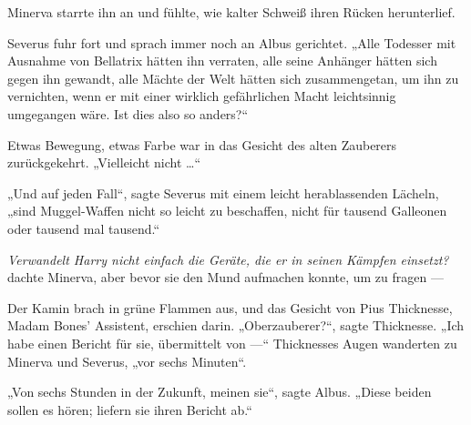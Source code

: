 Minerva starrte ihn an und fühlte, wie kalter Schweiß ihren Rücken herunterlief.

Severus fuhr fort und sprach immer noch an Albus gerichtet.
„Alle Todesser mit Ausnahme von Bellatrix hätten ihn verraten, alle seine Anhänger hätten sich gegen ihn gewandt, alle Mächte der Welt hätten sich zusammengetan, um ihn zu vernichten, wenn er mit einer wirklich gefährlichen Macht leichtsinnig umgegangen wäre. Ist dies also so anders?“

Etwas Bewegung, etwas Farbe war in das Gesicht des alten Zauberers zurückgekehrt.
„Vielleicht nicht …“

„Und auf jeden Fall“, sagte Severus mit einem leicht herablassenden Lächeln, „sind Muggel-Waffen nicht so leicht zu beschaffen, nicht für tausend Galleonen oder tausend mal tausend.“

\emph{Verwandelt Harry nicht einfach die Geräte, die er in seinen Kämpfen einsetzt?} dachte Minerva, aber bevor sie den Mund aufmachen konnte, um zu fragen —

Der Kamin brach in grüne Flammen aus, und das Gesicht von Pius Thicknesse, Madam Bones’ Assistent, erschien darin.
„Oberzauberer?“, sagte Thicknesse.
„Ich habe einen Bericht für sie, übermittelt von —“ Thicknesses Augen wanderten zu Minerva und Severus, „vor sechs Minuten“.

„Von sechs Stunden in der Zukunft, meinen sie“, sagte Albus.
„Diese beiden sollen es hören; liefern sie ihren Bericht ab.“


